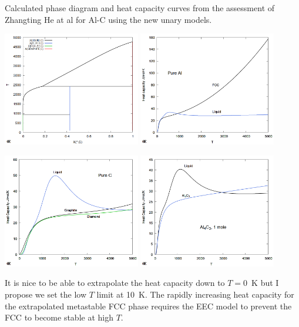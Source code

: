 \documentclass{article}
\begin{document}
\begin{appendices}
\newpage

Calculated phase diagram and heat capacity curves from the assessment
of Zhangting He at al for Al-C using the new unary models.

\includegraphics[width=0.45\textwidth]{Figs/AlC-PD.png}
\includegraphics[width=0.45\textwidth]{Figs/Al-Cp-fcc+liquid.png}

\includegraphics[width=0.45\textwidth]{Figs/C-Cp-all.png}
\includegraphics[width=0.45\textwidth]{Figs/Al4C3-Cp.png}

It is nice to be able to extrapolate the heat capacity down to $T=0$~K
but I propose we set the low $T$ limit at 10~K.  The rapidly
increasing heat capacity for the extrapolated metastable FCC phase
requires the EEC model to prevent the FCC to become stable at high $T$.


\end{appendices}
\end{document}
